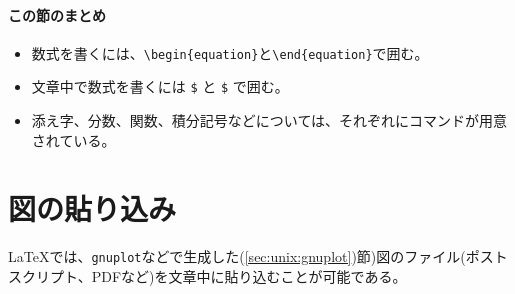 \paragraph{この節のまとめ}

\begin{itemize}
\item 数式を書くには、\verb|\begin{equation}|と\verb|\end{equation}|で囲む。
\item 文章中で数式を書くには \texttt{\$} と \texttt{\$} で囲む。
\item 添え字、分数、関数、積分記号などについては、それぞれにコマンドが用意されている。
\end{itemize}

\section{図の貼り込み}
\label{sec:latex:picture}

\LaTeX では、{\tt gnuplot}などで生成した(\ref{sec:unix:gnuplot})節)図のファイル(ポストスクリプト、PDFなど)を文章中に貼り込むことが可能である。



